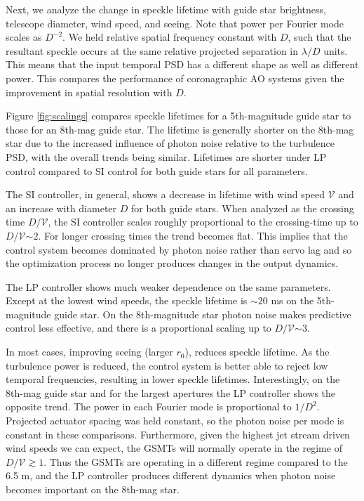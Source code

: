 \documentclass[10pt,preprint]{aastex631}
\begin{document}
Next, we analyze the change in speckle lifetime with guide star brightness, telescope diameter, wind speed, and seeing.  Note that power per Fourier mode scales as $D^{-2}$.  We held relative spatial frequency constant with $D$, such that the resultant speckle occurs at the same relative projected separation in $\lambda/D$ units.   This means that the input temporal PSD has a different shape as well as different power.  This compares the performance of coronagraphic AO systems given the improvement in spatial resolution with $D$.

Figure \ref{fig:scalings} compares speckle lifetimes for a 5th-magnitude guide star to those for an 8th-mag guide star.  The lifetime is generally shorter on the 8th-mag star due to the increased influence of photon noise relative to the turbulence PSD, with the overall trends being similar.  Lifetimes are shorter under LP control compared to SI control for both guide stars for all parameters.

The SI controller, in general, shows a decrease in lifetime with wind speed $\mathcal{V}$ and an increase with diameter $D$ for both guide stars.  When analyzed as the crossing time $D/\mathcal{V}$, the SI controller scales roughly proportional to the crossing-time up to $D/\mathcal{V}$$\sim$$2$.  For longer crossing times the trend becomes flat.  This implies that the control system becomes dominated by photon noise rather than servo lag and so the optimization process no longer produces changes in the output dynamics.

The LP controller shows much weaker dependence on the same parameters.  Except at the lowest wind speeds, the speckle lifetime is $\sim$$20$ ms on the 5th-magnitude guide star.  On the 8th-magnitude star photon noise makes predictive control less effective, and there is a proportional scaling up to $D/\mathcal{V}$$\sim$$3$.

In most cases, improving seeing (larger $r_0$), reduces speckle lifetime.  As the turbulence power is reduced, the control system is better able to reject low temporal frequencies, resulting in lower speckle lifetimes.  Interestingly, on the 8th-mag guide star and for the largest apertures the LP controller shows the opposite trend.  The power in each Fourier mode is proportional to $1/D^2$.  Projected actuator spacing was held constant, so the photon noise per mode is constant in these comparisons.  Furthermore, given the highest jet stream driven wind speeds we can expect, the GSMTs will normally operate in the regime of $D/\mathcal{V} \gtrsim 1$.  Thus the GSMTs are operating in a different regime compared to the 6.5 m, and the LP controller produces different dynamics  when photon noise becomes important on the 8th-mag star.
\end{document}
